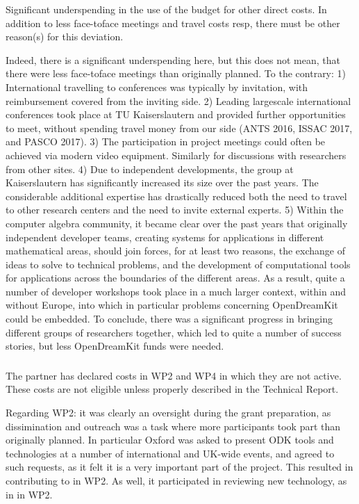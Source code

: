 \begin{EUcomment}
  Significant underspending in the use of the budget for other direct
  costs. In addition to less face-toface meetings and travel costs
  resp, there must be other reason(s) for this deviation.
\end{EUcomment}
Indeed, there is a significant underspending here, but this does not mean, that there were less face-toface
meetings than originally planned. To the contrary: 1) International travelling to conferences was typically 
by invitation, with reimbursement covered from the inviting side. 2) Leading largescale international conferences 
took place at TU Kaiserslautern and provided further opportunities to meet, without spending travel money from our 
side (ANTS 2016, ISSAC 2017, and PASCO 2017). 3) The participation in project meetings could often be achieved 
via modern video equipment. Similarly for discussions with researchers from other sites. 4) Due to independent 
developments, the group at Kaiserslautern has significantly increased its size over the past years. 
The considerable additional expertise has drastically reduced both the need to travel to other research centers 
and the need to invite external experts. 5) Within the computer algebra community, it became clear over the past 
years that originally independent developer teams, creating systems for applications in different mathematical 
areas, should join forces, for at least two reasons, the exchange of ideas to solve to  technical problems, and
the development of computational tools for applications across the boundaries of the different areas. As a result, 
quite a number of developer workshops took place in a much larger context, within and without Europe, into 
which in particular problems concerning OpenDreamKit could be embedded. To conclude, there was a significant 
progress in bringing different groups of researchers together, which led to quite a number of success stories, 
but less OpenDreamKit funds were needed.

\subsubsection{}
\begin{EUcomment}
  The partner has declared costs in WP2 and WP4 in which they are not
  active. These costs are not eligible unless properly described in
  the Technical Report.
\end{EUcomment}
Regarding WP2: it was clearly an oversight during the grant preparation, as dissimination and 
outreach was a task where more participants took part than originally planned. In particular Oxford 
was asked to present ODK tools and technologies at a number of international and UK-wide events,
and agreed to such requests, as it felt it is a very important part of the project. This resulted 
in contributing to  in WP2. As well, it participated in reviewing
new technology, as in  in WP2.

